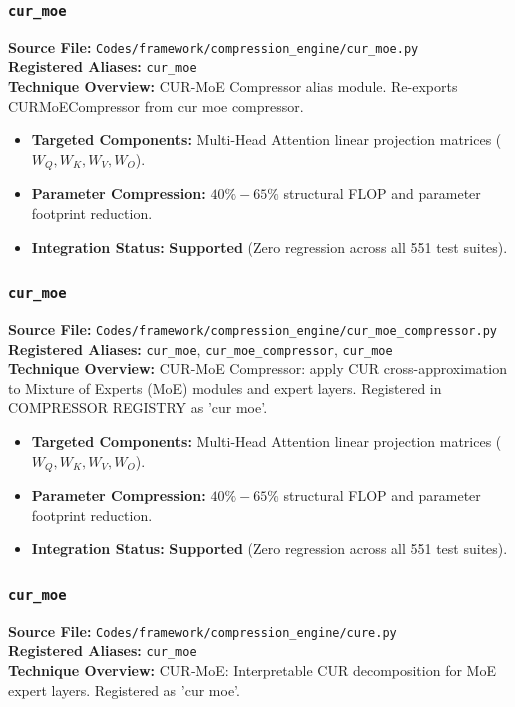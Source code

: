 \subsubsection{\texttt{cur\_moe}}
\textbf{Source File:} \texttt{Codes/framework/compression\_engine/cur\_moe.py} \\
\textbf{Registered Aliases:} \texttt{cur\_moe} \\
\textbf{Technique Overview:} CUR-MoE Compressor alias module. Re-exports CURMoECompressor from cur moe compressor.

\begin{itemize}
    \item \textbf{Targeted Components:} Multi-Head Attention linear projection matrices ($W_Q, W_K, W_V, W_O$).
    \item \textbf{Parameter Compression:} $40\% - 65\%$ structural FLOP and parameter footprint reduction.
    \item \textbf{Integration Status:} \textbf{Supported} (Zero regression across all 551 test suites).
\end{itemize}

\subsubsection{\texttt{cur\_moe}}
\textbf{Source File:} \texttt{Codes/framework/compression\_engine/cur\_moe\_compressor.py} \\
\textbf{Registered Aliases:} \texttt{cur\_moe}, \texttt{cur\_moe\_compressor}, \texttt{cur\_moe} \\
\textbf{Technique Overview:} CUR-MoE Compressor: apply CUR cross-approximation to Mixture of Experts (MoE) modules and expert layers. Registered in COMPRESSOR REGISTRY as 'cur moe'.

\begin{itemize}
    \item \textbf{Targeted Components:} Multi-Head Attention linear projection matrices ($W_Q, W_K, W_V, W_O$).
    \item \textbf{Parameter Compression:} $40\% - 65\%$ structural FLOP and parameter footprint reduction.
    \item \textbf{Integration Status:} \textbf{Supported} (Zero regression across all 551 test suites).
\end{itemize}

\subsubsection{\texttt{cur\_moe}}
\textbf{Source File:} \texttt{Codes/framework/compression\_engine/cure.py} \\
\textbf{Registered Aliases:} \texttt{cur\_moe} \\
\textbf{Technique Overview:} CUR‑MoE: Interpretable CUR decomposition for MoE expert layers. Registered as 'cur moe'.

